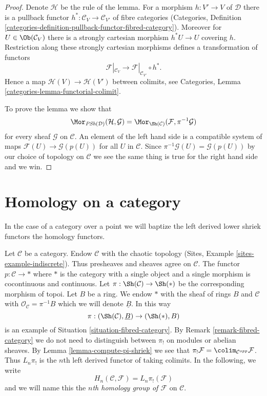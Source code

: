 \begin{proof}
Denote $\mathcal{H}$ be the rule of the lemma.
For a morphism $h : V' \to V$ of $\mathcal{D}$ there is a
pullback functor $h^* : \mathcal{C}_V \to \mathcal{C}_{V'}$ of fibre
categories (Categories, Definition
\ref{categories-definition-pullback-functor-fibred-category}).
Moreover for $U \in \Ob(\mathcal{C}_V)$ there is a
strongly cartesian morphism $h^*U \to U$ covering $h$.
Restriction along these strongly cartesian morphisms defines a
transformation of functors
$$
\mathcal{F}|_{\mathcal{C}_V}
\longrightarrow
\mathcal{F}|_{\mathcal{C}_{V'}} \circ h^*.
$$
Hence a map $\mathcal{H}(V) \to \mathcal{H}(V')$ between colimits, see
Categories, Lemma \ref{categories-lemma-functorial-colimit}.

\medskip\noindent
To prove the lemma we show that
$$
\Mor_{\textit{PSh}(\mathcal{D})}(\mathcal{H}, \mathcal{G}) =
\Mor_{\Sh(\mathcal{C})}(\mathcal{F}, \pi^{-1}\mathcal{G})
$$
for every sheaf $\mathcal{G}$ on $\mathcal{C}$. An element of the
left hand side is a compatible system of maps
$\mathcal{F}(U) \to \mathcal{G}(p(U))$ for all $U$ in $\mathcal{C}$.
Since $\pi^{-1}\mathcal{G}(U) = \mathcal{G}(p(U))$ by our choice
of topology on $\mathcal{C}$ we see the same thing is true for the
right hand side and we win.
\end{proof}





\section{Homology on a category}
\label{section-homology}

\noindent
In the case of a category over a point we will baptize the left derived
lower shriek functors the homology functors.

\begin{example}
\label{example-category-to-point}
Let $\mathcal{C}$ be a category. Endow $\mathcal{C}$ with the chaotic
topology (Sites, Example \ref{sites-example-indiscrete}). Thus
presheaves and sheaves agree on $\mathcal{C}$.
The functor $p : \mathcal{C} \to *$ where $*$ is the category with a single
object and a single morphism is cocontinuous and continuous. Let
$\pi : \Sh(\mathcal{C}) \to \Sh(*)$ be the corresponding morphism
of topoi. Let $B$ be a ring. We endow $*$ with the sheaf of rings $B$
and $\mathcal{C}$ with $\mathcal{O}_\mathcal{C} = \pi^{-1}B$ which
we will denote $\underline{B}$. In this way
$$
\pi : (\Sh(\mathcal{C}), \underline{B}) \to (\Sh(*), B)
$$
is an example of Situation \ref{situation-fibred-category}.
By Remark \ref{remark-fibred-category} we do not need to distinguish
between $\pi_!$ on modules or abelian sheaves. By
Lemma \ref{lemma-compute-pi-shriek} we see that
$\pi_!\mathcal{F} = \colim_{\mathcal{C}^{opp}} \mathcal{F}$.
Thus $L_n\pi_!$ is the $n$th left derived functor of taking colimits.
In the following, we write
$$
H_n(\mathcal{C}, \mathcal{F}) = L_n\pi_!(\mathcal{F})
$$
and we will name this the {\it $n$th homology group of $\mathcal{F}$}
on $\mathcal{C}$.
\end{example}

